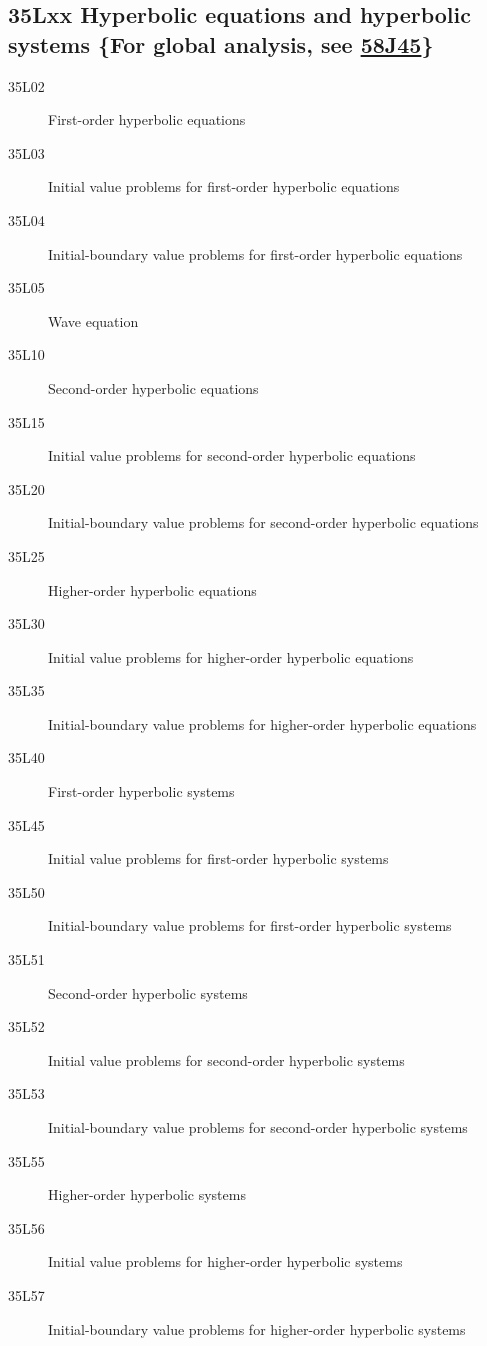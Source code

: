 \subsection*{35Lxx  Hyperbolic  equations and hyperbolic systems  \{For global analysis, see \hyperref[58J45]{58J45}\} }\label{35Lxx}
\begin{description}  
\item [35L02]\label{35L02} First-order hyperbolic equations
\item [35L03]\label{35L03} Initial value problems for first-order hyperbolic equations
\item [35L04]\label{35L04} Initial-boundary value problems for first-order hyperbolic equations
\item [35L05]\label{35L05} Wave equation
\item [35L10]\label{35L10} Second-order hyperbolic equations
\item [35L15]\label{35L15} Initial value problems for second-order hyperbolic equations
\item [35L20]\label{35L20} Initial-boundary value problems for second-order hyperbolic equations
\item [35L25]\label{35L25} Higher-order hyperbolic equations
\item [35L30]\label{35L30} Initial value problems for higher-order hyperbolic equations
\item [35L35]\label{35L35} Initial-boundary value problems for higher-order hyperbolic equations
\item [35L40]\label{35L40} First-order hyperbolic systems  
\item [35L45]\label{35L45} Initial value problems for first-order hyperbolic systems
\item [35L50]\label{35L50} Initial-boundary value problems for first-order hyperbolic systems
\item [35L51]\label{35L51} Second-order hyperbolic systems 
\item [35L52]\label{35L52} Initial value problems for second-order hyperbolic systems 
\item [35L53]\label{35L53} Initial-boundary value problems for second-order hyperbolic systems 
\item [35L55]\label{35L55} Higher-order hyperbolic systems 
\item [35L56]\label{35L56} Initial value problems for higher-order hyperbolic systems 
\item [35L57]\label{35L57} Initial-boundary value problems for higher-order hyperbolic systems 

\end{description}
